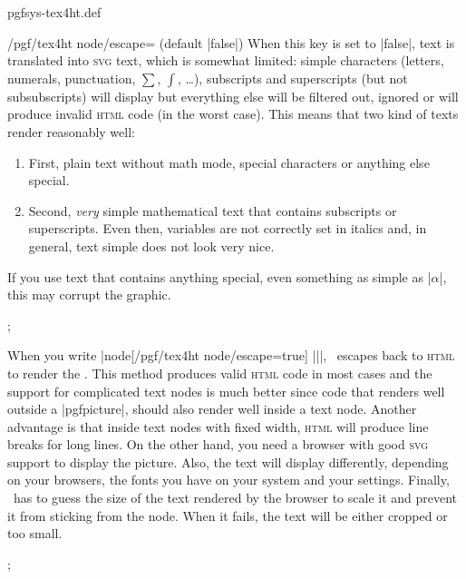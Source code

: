 \begin{filedescription}{pgfsys-tex4ht.def}
\begin{key}{/pgf/tex4ht node/escape= (default |false|)}
    When this key is set to |false|, text is translated into
    \textsc{svg} text, which is somewhat limited: simple
    characters (letters, numerals, punctuation, $\sum$, $\int$, \ldots),
    subscripts and superscripts (but not subsubscripts) will display but
    everything else will be filtered out, ignored or will produce
    invalid \textsc{html} code (in the worst case). This means that two
    kind of texts render reasonably well:
    \begin{enumerate}
    \item First, plain text without math mode, special characters or
      anything else special.
    \item Second, \emph{very} simple mathematical text that contains
      subscripts or superscripts. Even then, variables are not correctly
      set in italics and, in general, text simple does not look very
      nice.
    \end{enumerate}
    If you use text that contains anything special, even something as
    simple as |$\alpha$|, this may corrupt the graphic.

\begin{codeexample}
\tikz {};
\end{codeexample}

    When you write |node[/pgf/tex4ht node/escape=true] {||}|,
    \pgfname\ escapes back to \textsc{html} to render the
    . This method produces valid \textsc{html} code in most
    cases and the support for complicated text nodes is much better since
    code that renders well outside a |{pgfpicture}|, should also
    render well inside a text node. Another advantage is that inside
    text nodes with fixed width, \textsc{html} will produce line
    breaks for long  lines. On the other hand, you need a browser with
    good \textsc{svg} support to display the picture. Also, the text
    will display differently, depending on your browsers, the fonts
    you have on your system and your settings. Finally,
    \pgfname\ has to guess the size of the text rendered by the
    browser to scale it and prevent it from sticking from the
    node. When it fails, the text will be either cropped or too small.
\begin{codeexample}
\tikz {};
\end{codeexample}
  \end{key}


\end{filedescription}
